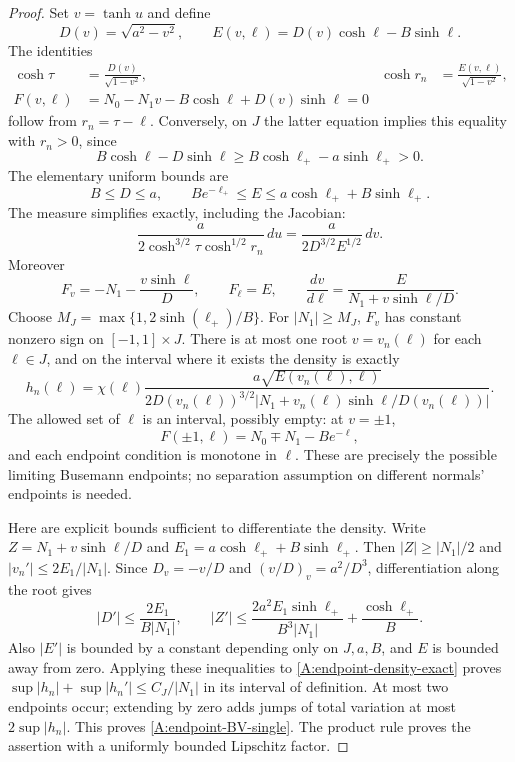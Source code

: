 \begin{proof}
Set $v=\tanh u$ and define
\[
 D(v)=\sqrt{a^2-v^2},\qquad
 E(v,\ell)=D(v)\cosh\ell-B\sinh\ell.
\]
The identities
\begin{align*}
 \cosh\tau&=\frac{D(v)}{\sqrt{1-v^2}},&
 \cosh r_n&=\frac{E(v,\ell)}{\sqrt{1-v^2}},\\
 F(v,\ell)&=N_0-N_1v-B\cosh\ell+D(v)\sinh\ell=0
\end{align*}
follow from $r_n=\tau-\ell$.  Conversely, on $J$ the latter
equation implies this equality with $r_n>0$, since
\[
 B\cosh\ell-D\sinh\ell
 \geq B\cosh\ell_+-a\sinh\ell_+>0.
\]
The elementary uniform bounds are
\[
 B\leq D\leq a,\qquad
 B e^{-\ell_+}\leq E\leq a\cosh\ell_+ +B\sinh\ell_+.
\]
The measure simplifies exactly, including the Jacobian:
\[
 \frac{a}{2\cosh^{3/2}\tau\cosh^{1/2}r_n}\,du
 =\frac{a}{2D^{3/2}E^{1/2}}\,dv.
\]
Moreover
\[
 F_v=-N_1-\frac{v\sinh\ell}{D},\qquad
 F_\ell=E,\qquad
 \frac{dv}{d\ell}=
 \frac{E}{N_1+v\sinh\ell/D}.
\]
Choose
$M_J=\max\{1,2\sinh(\ell_+)/B\}$.
For $|N_1|\geq M_J$, $F_v$ has constant nonzero sign on
$[-1,1]\times J$.  There is at most one root $v=v_n(\ell)$
for each $\ell\in J$, and on the interval where it exists
the density is exactly
\begin{equation}\label{A:endpoint-density-exact}
 h_n(\ell)=\chi(\ell)
 \frac{a\sqrt{E(v_n(\ell),\ell)}}
 {2D(v_n(\ell))^{3/2}
  |N_1+v_n(\ell)\sinh\ell/D(v_n(\ell))|}.
\end{equation}
The allowed set of $\ell$ is an interval, possibly empty:
at $v=\pm1$,
\[
 F(\pm1,\ell)=N_0\mp N_1-B e^{-\ell},
\]
and each endpoint condition is monotone in $\ell$.
These are precisely the possible limiting Busemann endpoints;
no separation assumption on different normals' endpoints is needed.

Here are explicit bounds sufficient to differentiate the density.
Write $Z=N_1+v\sinh\ell/D$ and
$E_1=a\cosh\ell_+ +B\sinh\ell_+$.
Then $|Z|\geq|N_1|/2$ and
$|v_n'|\leq2E_1/|N_1|$.
Since $D_v=-v/D$ and $(v/D)_v=a^2/D^3$, differentiation
along the root gives
\[
 |D'|\leq\frac{2E_1}{B|N_1|},\qquad
 |Z'|\leq\frac{2a^2E_1\sinh\ell_+}{B^3|N_1|}
                  +\frac{\cosh\ell_+}{B}.
\]
Also $|E'|$ is bounded by a constant depending only on $J,a,B$,
and $E$ is bounded away from zero.  Applying these inequalities
to \eqref{A:endpoint-density-exact} proves
$\sup|h_n|+\sup|h_n'|\leq C_J/|N_1|$ in its interval of
definition.  At most two endpoints occur; extending by zero adds
jumps of total variation at most $2\sup|h_n|$.
This proves \eqref{A:endpoint-BV-single}.  The product rule proves
the assertion with a uniformly bounded Lipschitz factor.
\end{proof}

